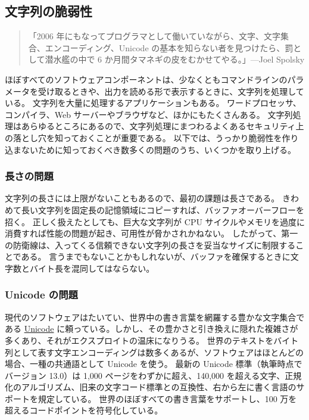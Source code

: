\documentclass[uplatex]{jsarticle}
\def\label#1{}%
\begin{document}
\subsection{文字列の脆弱性}\label{subsec:ch10-string-vulnerabilities}

\begin{quote}
「2006 年にもなってプログラマとして働いていながら、文字、文字集合、エンコーディング、Unicode の基本を知らない者を見つけたら、罰として潜水艦の中で 6 か月間タマネギの皮をむかせてやる。」---Joel Spolsky
\end{quote}

ほぼすべてのソフトウェアコンポーネントは、少なくともコマンドラインのパラメータを受け取るときや、出力を読める形で表示するときに、文字列を処理している。
文字列を大量に処理するアプリケーションもある。
ワードプロセッサ、コンパイラ、Web サーバーやブラウザなど、ほかにもたくさんある。
文字列処理はあらゆるところにあるので、文字列処理にまつわるよくあるセキュリティ上の落とし穴を知っておくことが重要である。
以下では、うっかり脆弱性を作り込まないために知っておくべき数多くの問題のうち、いくつかを取り上げる。

\subsubsection{長さの問題}

文字列の長さには上限がないこともあるので、最初の課題は長さである。
きわめて長い文字列を固定長の記憶領域にコピーすれば、バッファオーバーフローを招く。
正しく扱えたとしても、巨大な文字列が CPU サイクルやメモリを過度に消費すれば性能の問題が起き、可用性が脅かされかねない。
したがって、第一の防衛線は、入ってくる信頼できない文字列の長さを妥当なサイズに制限することである。
言うまでもないことかもしれないが、バッファを確保するときに文字数とバイト長を混同してはならない。

\subsubsection{Unicode の問題}

現代のソフトウェアはたいてい、世界中の書き言葉を網羅する豊かな文字集合である \underline{Unicode} に頼っている。しかし、その豊かさと引き換えに隠れた複雑さが多くあり、それがエクスプロイトの温床になりうる。
世界のテキストをバイト列として表す文字エンコーディングは数多くあるが、ソフトウェアはほとんどの場合、一種の共通語として Unicode を使う。
最新の Unicode 標準（執筆時点でバージョン 13.0）は 1,000 ページをわずかに超え、140,000 を超える文字、正規化のアルゴリズム、旧来の文字コード標準との互換性、右から左に書く言語のサポートを規定している。
世界のほぼすべての書き言葉をサポートし、100 万を超えるコードポイントを符号化している。
\end{document}
